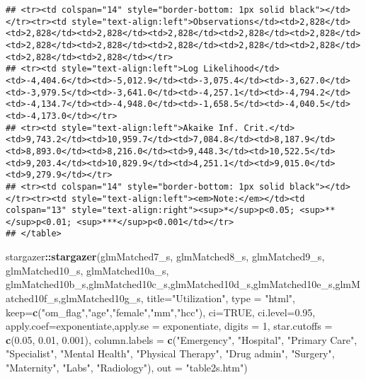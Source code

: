 \documentclass[]{article}
\newenvironment{Shaded}{\begin{snugshade}}{\end{snugshade}}
\newcommand{\KeywordTok}[1]{\textcolor[rgb]{0.13,0.29,0.53}{\textbf{#1}}}
\newcommand{\DataTypeTok}[1]{\textcolor[rgb]{0.13,0.29,0.53}{#1}}
\newcommand{\DecValTok}[1]{\textcolor[rgb]{0.00,0.00,0.81}{#1}}
\newcommand{\FloatTok}[1]{\textcolor[rgb]{0.00,0.00,0.81}{#1}}
\newcommand{\StringTok}[1]{\textcolor[rgb]{0.31,0.60,0.02}{#1}}
\newcommand{\OtherTok}[1]{\textcolor[rgb]{0.56,0.35,0.01}{#1}}
\newcommand{\OperatorTok}[1]{\textcolor[rgb]{0.81,0.36,0.00}{\textbf{#1}}}
\newcommand{\NormalTok}[1]{#1}
\begin{document}
\begin{verbatim}
## <tr><td colspan="14" style="border-bottom: 1px solid black"></td></tr><tr><td style="text-align:left">Observations</td><td>2,828</td><td>2,828</td><td>2,828</td><td>2,828</td><td>2,828</td><td>2,828</td><td>2,828</td><td>2,828</td><td>2,828</td><td>2,828</td><td>2,828</td><td>2,828</td><td>2,828</td></tr>
## <tr><td style="text-align:left">Log Likelihood</td><td>-4,404.6</td><td>-5,012.9</td><td>-3,075.4</td><td>-3,627.0</td><td>-3,979.5</td><td>-3,641.0</td><td>-4,257.1</td><td>-4,794.2</td><td>-4,134.7</td><td>-4,948.0</td><td>-1,658.5</td><td>-4,040.5</td><td>-4,173.0</td></tr>
## <tr><td style="text-align:left">Akaike Inf. Crit.</td><td>9,743.2</td><td>10,959.7</td><td>7,084.8</td><td>8,187.9</td><td>8,893.0</td><td>8,216.0</td><td>9,448.3</td><td>10,522.5</td><td>9,203.4</td><td>10,829.9</td><td>4,251.1</td><td>9,015.0</td><td>9,279.9</td></tr>
## <tr><td colspan="14" style="border-bottom: 1px solid black"></td></tr><tr><td style="text-align:left"><em>Note:</em></td><td colspan="13" style="text-align:right"><sup>*</sup>p<0.05; <sup>**</sup>p<0.01; <sup>***</sup>p<0.001</td></tr>
## </table>
\end{verbatim}

\begin{Shaded}
\begin{Highlighting}[]
\NormalTok{stargazer}\OperatorTok{::}\KeywordTok{stargazer}\NormalTok{(glmMatched7_s, glmMatched8_s, glmMatched9_s, glmMatched10_s, glmMatched10a_s, glmMatched10b_s,glmMatched10c_s,glmMatched10d_s,glmMatched10e_s,glmMatched10f_s,glmMatched10g_s,}
          \DataTypeTok{title=}\StringTok{"Utilization"}\NormalTok{, }
          \DataTypeTok{type =} \StringTok{"html"}\NormalTok{,}
          \DataTypeTok{keep=}\KeywordTok{c}\NormalTok{(}\StringTok{"om_flag"}\NormalTok{,}\StringTok{"age"}\NormalTok{,}\StringTok{"female"}\NormalTok{,}\StringTok{"mm"}\NormalTok{,}\StringTok{"hcc"}\NormalTok{),}
          \DataTypeTok{ci=}\OtherTok{TRUE}\NormalTok{, }\DataTypeTok{ci.level=}\FloatTok{0.95}\NormalTok{,}
          \DataTypeTok{apply.coef=}\NormalTok{exponentiate,}\DataTypeTok{apply.se =}\NormalTok{ exponentiate,}
          \DataTypeTok{digits =} \DecValTok{1}\NormalTok{, }
          \DataTypeTok{star.cutoffs =} \KeywordTok{c}\NormalTok{(}\FloatTok{0.05}\NormalTok{, }\FloatTok{0.01}\NormalTok{, }\FloatTok{0.001}\NormalTok{),}
          \DataTypeTok{column.labels =} \KeywordTok{c}\NormalTok{(}\StringTok{"Emergency"}\NormalTok{, }\StringTok{"Hospital"}\NormalTok{, }\StringTok{"Primary Care"}\NormalTok{, }\StringTok{"Specialist"}\NormalTok{, }\StringTok{"Mental Health"}\NormalTok{, }\StringTok{"Physical Therapy"}\NormalTok{, }\StringTok{"Drug admin"}\NormalTok{, }\StringTok{"Surgery"}\NormalTok{, }\StringTok{"Maternity"}\NormalTok{, }\StringTok{"Labs"}\NormalTok{, }\StringTok{"Radiology"}\NormalTok{),}
          \DataTypeTok{out =} \StringTok{"table2s.htm"}\NormalTok{)}
\end{Highlighting}
\end{Shaded}
\end{document}
